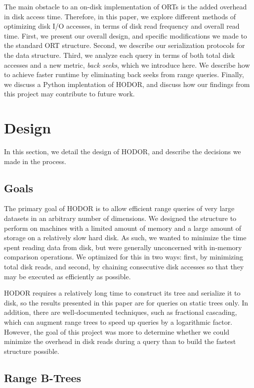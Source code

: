 \documentclass[11pt, oneside]{article}
\begin{document}
The main obstacle to an on-disk implementation of ORTs is the added overhead in
disk access time. Therefore, in this paper, we explore different methods of
optimizing disk I/O accesses, in terms of disk read frequency and overall read
time. First, we present our overall design, and specific modifications we made
to the standard ORT structure. Second, we describe our serialization protocols
for the data structure. Third, we analyze each query in terms of both total disk
accesses and a new metric, \textit{back seeks}, which we introduce here. We
describe how to achieve faster runtime by eliminating back seeks from range
queries. Finally, we discuss a Python implentation of HODOR, and discuss how our
findings from this project may contribute to future work.

\section{Design}

In this section, we detail the design of HODOR, and describe the decisions we
made in the process.

\subsection{Goals}

The primary goal of HODOR is to allow efficient range queries of very large
datasets in an arbitrary number of dimensions. We designed the structure to
perform on machines with a limited amount of memory and a large amount of
storage on a relatively slow hard disk. As such, we wanted to minimize the
time spent reading data from disk, but were generally unconcerned with
in-memory comparison operations. We optimized for this in two ways: first, by
minimizing total disk reads, and second, by chaining consecutive disk accesses
so that they may be executed as efficiently as possible. 

HODOR requires a relatively long time to construct its tree and serialize it to
disk, so the results presented in this paper are for queries on static trees
only. In addition, there are well-documented techniques, such as fractional
cascading, which can augment range trees to speed up queries by a logarithmic
factor. However, the goal of this project was more to determine whether we could
minimize the overhead in disk reads during a query than to build the fastest
structure possible.

\subsection{Range B-Trees}
\end{document}
